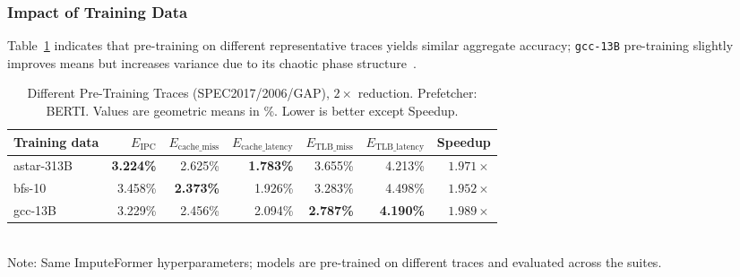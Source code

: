 \subsubsection*{Impact of Training Data}
Table~\ref{tab:sensitivity_training_onecol} indicates that pre-training on different representative traces yields similar aggregate accuracy; \texttt{gcc-13B} pre-training slightly improves means but increases variance due to its chaotic phase structure~\cite{Shen+:ASPLOS04}. %
\begin{table}[htbp!]
  \caption{Different Pre-Training Traces (SPEC2017/2006/GAP), $2\times$ reduction. Prefetcher: BERTI. Values are geometric means in \%. Lower is better except Speedup.}
  \label{tab:sensitivity_training_onecol}
  \centering
  \setlength{\tabcolsep}{2pt}
  \begin{adjustbox}{max width=1.0\columnwidth}
  \begin{tabular}{l|rrrrrr}
  \toprule
  Training data & ${E}_{\text{IPC}}$  & $E_{\text{cache\_miss}}$  &$E_{\text{cache\_latency}}$  & $E_{\text{TLB\_miss}}$    & $E_{\text{TLB\_latency}}$   & Speedup \\
  \midrule
  astar-313B & \textbf{3.224\%} & 2.625\% & \textbf{1.783\%} & 3.655\% & 4.213\% & $1.971\times$ \\
  bfs-10     & 3.458\% & \textbf{2.373\%} & 1.926\% & 3.283\% & 4.498\% & $1.952\times$ \\
  gcc-13B    & 3.229\% & 2.456\% & 2.094\% & \textbf{2.787\%} & \textbf{4.190\%} & \textbf{$1.989\times$} \\
  \bottomrule
  \end{tabular}
  \end{adjustbox}
  \vspace{0.25ex}
  \\
  \footnotesize Note: Same ImputeFormer hyperparameters; models are pre-trained on different traces and evaluated across the suites.
\end{table}
